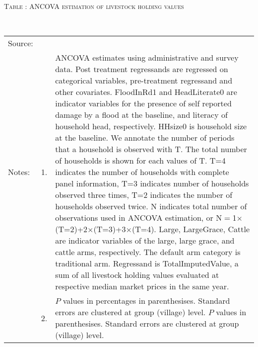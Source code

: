 \hspace{-1cm}\begin{minipage}[t]{14cm}
\hfil\textsc{\normalsize Table \thetable: ANCOVA estimation of livestock holding values\label{tab ANCOVA livestock}}\\
\setlength{\tabcolsep}{1pt}
\setlength{\baselineskip}{8pt}
\renewcommand{\arraystretch}{.55}
\hfil{}\\
\renewcommand{\arraystretch}{.8}
\setlength{\tabcolsep}{1pt}
\begin{tabular}{>{\hfill\scriptsize}p{1cm}<{}>{\hfill\scriptsize}p{.25cm}<{}>{\scriptsize}p{12cm}<{\hfill}}
Source:& \multicolumn{2}{l}{\scriptsize Estimated with GUK administrative and survey data.}\\
Notes: & 1. & ANCOVA estimates using administrative and survey data. Post treatment regressands are regressed on categorical variables, pre-treatment regressand and other covariates. \textsf{FloodInRd1} and \textsf{HeadLiterate0} are indicator variables for the presence of self reported damage by a flood at the baseline, and literacy of household head, respectively. \textsf{HHsize0} is household size at the baseline. We annotate the number of periods that a household is observed with \textsf{T}. The total number of households is shown for each values of \textsf{T}. \textsf{T=4} indicates the number of households with complete panel information, \textsf{T=3} indicates number of households observed three times, \textsf{T=2} indicates the number of households observed twice. \textsf{N} indicates total number of observations used in ANCOVA estimation, or \textsf{N$=$1$\times$(T=2)+2$\times$(T=3)+3$\times$(T=4)}.  \textsf{Large}, \textsf{LargeGrace}, \textsf{Cattle} are indicator variables of the \textsf{large}, \textsf{large grace}, and \textsf{cattle} arms, respectively. The default arm category is \textsf{traditional} arm. Regressand is \textsf{TotalImputedValue}, a sum of all livestock holding values evaluated at respective median market prices in the same year. \\
& 2. & $P$ values in percentages in parenthesises. Standard errors are clustered at group (village) level.%
$P$ values in parenthesises. Standard errors are clustered at group (village) level.
\end{tabular}
\end{minipage}


